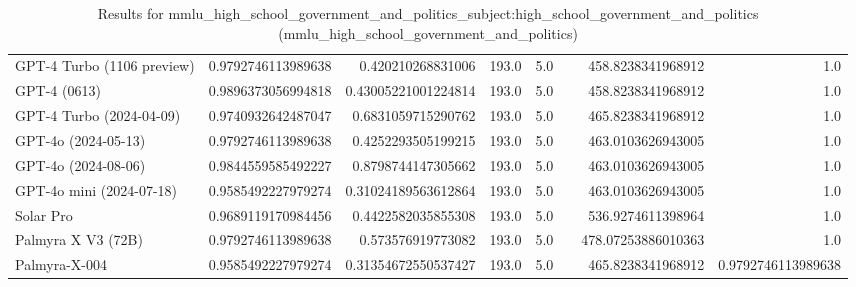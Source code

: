 \begin{table}[htp]
{\begin{tabular}{lrrrrrrr}
GPT-4 Turbo (1106 preview) & 0.9792746113989638 & 0.420210268831006 & 193.0 & 5.0 &  & 458.8238341968912 & 1.0 \\
GPT-4 (0613) & 0.9896373056994818 & 0.43005221001224814 & 193.0 & 5.0 &  & 458.8238341968912 & 1.0 \\
GPT-4 Turbo (2024-04-09) & 0.9740932642487047 & 0.6831059715290762 & 193.0 & 5.0 &  & 465.8238341968912 & 1.0 \\
GPT-4o (2024-05-13) & 0.9792746113989638 & 0.4252293505199215 & 193.0 & 5.0 &  & 463.0103626943005 & 1.0 \\
GPT-4o (2024-08-06) & 0.9844559585492227 & 0.8798744147305662 & 193.0 & 5.0 &  & 463.0103626943005 & 1.0 \\
GPT-4o mini (2024-07-18) & 0.9585492227979274 & 0.31024189563612864 & 193.0 & 5.0 &  & 463.0103626943005 & 1.0 \\
Solar Pro & 0.9689119170984456 & 0.4422582035855308 & 193.0 & 5.0 &  & 536.9274611398964 & 1.0 \\
Palmyra X V3 (72B) & 0.9792746113989638 & 0.573576919773082 & 193.0 & 5.0 &  & 478.07253886010363 & 1.0 \\
Palmyra-X-004 & 0.9585492227979274 & 0.31354672550537427 & 193.0 & 5.0 &  & 465.8238341968912 & 0.9792746113989638 \\
\bottomrule
\end{tabular}}
\caption{Results for mmlu_high_school_government_and_politics_subject:high_school_government_and_politics (mmlu_high_school_government_and_politics)}
\label{fig:mmlu_high_school_government_and_politics_subject:high_school_government_and_politics (mmlu_high_school_government_and_politics)}
\end{table}